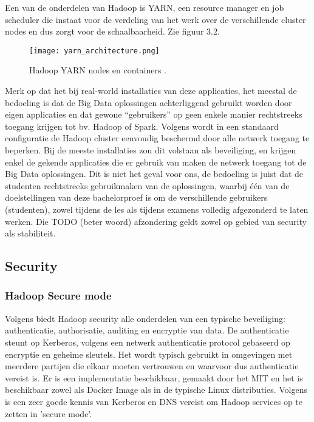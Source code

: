 Een van de onderdelen van Hadoop is YARN, een resource manager en job scheduler die instaat voor de verdeling van het werk over de verschillende cluster nodes en dus zorgt voor de schaalbaarheid. Zie figuur 3.2.
\newline
\begin{figure}[H]
    \texttt{[image: yarn\_architecture.png]}
    \caption{Hadoop YARN nodes en containers \autocite{Hadoop2023d}.}
\end{figure}

Merk op dat het bij real-world installaties van deze applicaties, het meestal de bedoeling is dat de Big Data oplossingen achterliggend gebruikt worden door eigen applicaties en dat gewone ``gebruikers'' op geen enkele manier rechtstreeks toegang krijgen tot bv. Hadoop of Spark.
\newline
Volgens \autocite{Hadoop2023} wordt in een standaard configuratie de Hadoop cluster eenvoudig beschermd door alle netwerk toegang te beperken. 
Bij de meeste installaties zou dit volstaan als beveiliging, en krijgen enkel de gekende applicaties die er gebruik van maken de netwerk toegang tot de Big Data oplossingen.
\newline
\newline
Dit is niet het geval voor ons, de bedoeling is juist dat de studenten rechtstreeks gebruikmaken van de oplossingen, waarbij één van de doelstellingen van deze bachelorproef is om de verschillende gebruikers (studenten), zowel tijdens de les als tijdens examens volledig afgezonderd te laten werken. Die TODO (beter woord) afzondering geldt zowel op gebied van security als stabiliteit.

\subsection{Security}

\subsubsection{Hadoop Secure mode}
Volgens \textcite{Kiran2022} biedt Hadoop security alle onderdelen van een typische beveiliging: authenticatie, authorisatie, auditing en encryptie van data.
De authenticatie steunt op Kerberos, volgens \textcite{Kerberos2023} een netwerk authenticatie protocol gebaseerd op encryptie en geheime sleutels. Het wordt typisch gebruikt in omgevingen met meerdere partijen die elkaar moeten vertrouwen en waarvoor dus authenticatie vereist is. Er is een implementatie beschikbaar, gemaakt door het MIT en het is beschikbaar zowel als Docker Image als in de typische Linux distributies.
\newline
Volgens \textcite{Hadoop2023} is een zeer goede kennis van Kerberos en DNS vereist om Hadoop services op te zetten in 'secure mode'.
\newline
\newline


